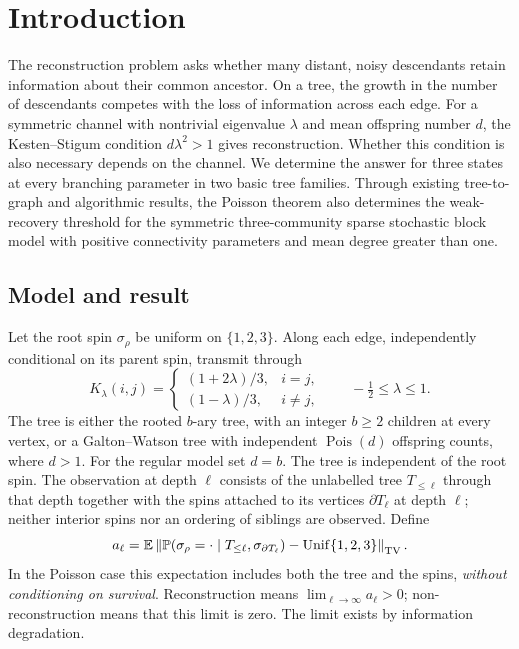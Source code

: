 \section{Introduction}\label{sec:introduction}
The reconstruction problem asks whether many distant, noisy descendants
retain information about their common ancestor. On a tree, the growth in
the number of descendants competes with the loss of information across
each edge. For a symmetric channel with nontrivial eigenvalue $\lambda$
and mean offspring number $d$, the Kesten--Stigum condition
$d\lambda^2>1$ gives reconstruction. Whether this condition is also
necessary depends on the channel. We determine the answer for three
states at every branching parameter in two basic tree families.
Through existing tree-to-graph and algorithmic results, the Poisson
theorem also determines the weak-recovery threshold for the symmetric
three-community sparse stochastic block model with positive connectivity
parameters and mean degree greater than one.

\subsection{Model and result}
Let the root spin $\sigma_\rho$ be uniform on $\{1,2,3\}$. Along each
edge, independently conditional on its parent spin, transmit through
\begin{equation}\label{eq:channel}
 K_\lambda(i,j)=
 \begin{cases}
 (1+2\lambda)/3,&i=j,\\
 (1-\lambda)/3,&i\ne j,
 \end{cases}
 \qquad -\tfrac12\le\lambda\le1.
\end{equation}
The tree is either the rooted $b$-ary tree, with an integer $b\ge2$
children at every vertex, or a Galton--Watson tree with independent
$\operatorname{Pois}(d)$ offspring counts, where $d>1$.
For the regular model set $d=b$. The tree is independent of the root
spin. The observation at depth $\ell$ consists of the unlabelled tree
$T_{\le\ell}$ through that depth together with the spins attached to its
vertices $\partial T_\ell$ at depth $\ell$; neither interior spins nor
an ordering of siblings are observed. Define
\begin{equation}\label{eq:advantage}
 a_\ell=\mathbb E\left\|
 \mathbb P(\sigma_\rho=\cdot\mid T_{\le\ell},\sigma_{\partial T_\ell})
 -\operatorname{Unif}\{1,2,3\}\right\|_{\mathrm{TV}}.
\end{equation}
In the Poisson case this expectation includes both the tree and the
spins, \emph{without conditioning on survival}. Reconstruction means
$\lim_{\ell\to\infty}a_\ell>0$; non-reconstruction means that this
limit is zero. The limit exists by information degradation.

